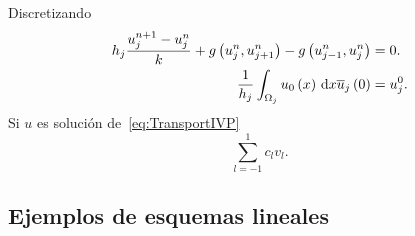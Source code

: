 \begin{frame}
	\frametitle{\secname}

	Discretizando
	\begin{align*}
		h_{j}
		\frac{u^{n+1}_{j}-u^{n}_{j}}{k}+
		g\left(u^{n}_{j},u^{n}_{j+1}\right)-
		g\left(u^{n}_{j-1},u^{n}_{j}\right) & =
		0.                                      \\
		\frac{1}{h_{j}}
		\int_{\Omega_{j}}
		u_{0}\left(x\right)\dl x
		\overline{u}_{j}\left(0\right)      & =
		u^{0}_{j}.
	\end{align*}
	Si $u$ es solución de~\eqref{eq:TransportIVP}
	\begin{equation*}
		\sum_{l=-1}^{1}
		c_{l}v_{l}.
	\end{equation*}
\end{frame}


\subsection{Ejemplos de esquemas lineales}

